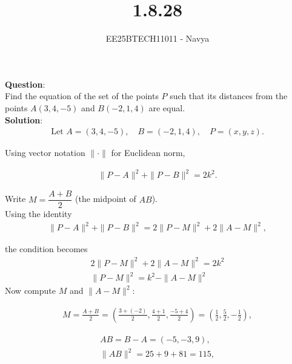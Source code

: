\documentclass[journal]{IEEEtran}
\begin{document}

\vspace{3cm}

\title{1.8.28}
\author{EE25BTECH11011 - Navya}
{\let\newpage\relax\maketitle}

\renewcommand{\thefigure}{\theenumi}
\renewcommand{\thetable}{\theenumi}
\setlength{\intextsep}{10pt} %

\textbf{Question}:\\
Find the equation of the set of the points $P$ such that its distances 
from the points $A(3,4,-5)$ and $B(-2,1,4)$ are equal.\\

\textbf{Solution}:\\
\begin{align}
\text{Let }A=(3,4,-5),\quad B=(-2,1,4),\quad P=(x,y,z).
\end{align}

Using vector notation $\|\cdot\|$ for Euclidean norm,

\begin{align}
\|P-A\|^2+\|P-B\|^2=2k^2.
\end{align}

Write $M=\dfrac{A+B}{2}$ (the midpoint of $AB$).\\

Using the identity
\begin{align}
\|P-A\|^2+\|P-B\|^2=2\|P-M\|^2+2\|A-M\|^2,
\end{align}

the condition becomes
\begin{align}
2\|P-M\|^2+2\|A-M\|^2=2k^2\\
\|P-M\|^2=k^2-\|A-M\|^2
\end{align}
Now compute $M$ and $\|A-M\|^2$:

\begin{align}
M=\frac{A+B}{2}=\left(\frac{3+(-2)}{2},\frac{4+1}{2},\frac{-5+4}{2}\right)
=\left(\frac{1}{2},\frac{5}{2},-\frac{1}{2}\right),
\end{align}

\begin{align}
AB=B-A=(-5,-3,9),\\
\|AB\|^2=25+9+81=115,
\end{align}
\end{document}
